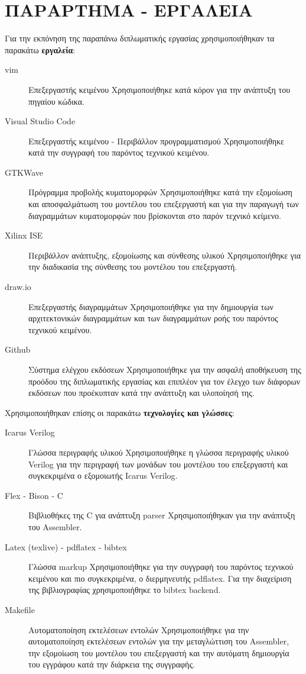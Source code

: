 \documentclass[11pt]{extarticle}
\let\stdsection\section
\renewcommand\section{\newpage\stdsection}
\begin{document}
\section{ΠΑΡΑΡΤΗΜΑ - ΕΡΓΑΛΕΙΑ}
Για την εκπόνηση της παραπάνω διπλωματικής εργασίας χρησιμοποιήθηκαν τα παρακάτω \textbf{εργαλεία}:
\begin{description}
    \item [vim] Επεξεργαστής κειμένου \newline
    Χρησιμοποιήθηκε κατά κόρον για την ανάπτυξη του πηγαίου κώδικα.
    \item [Visual Studio Code] Επεξεργαστής κειμένου - Περιβάλλον προγραμματισμού \newline
    Χρησιμοποιήθηκε κατά την συγγραφή του παρόντος τεχνικού κειμένου.
    \item [GTKWave] Πρόγραμμα προβολής κυματομορφών \newline
    Χρησιμοποιήθηκε κατά την εξομοίωση και αποσφαλμάτωση του μοντέλου του επεξεργαστή και για την παραγωγή των διαγραμμάτων κυματομορφών που βρίσκονται στο παρόν τεχνικό κείμενο.
    \item [Xilinx ISE] Περιβάλλον ανάπτυξης, εξομοίωσης και σύνθεσης υλικού \newline
    Χρησιμοποιήθηκε για την διαδικασία της σύνθεσης του μοντέλου του επεξεργαστή.
    \item [draw.io] Επεξεργαστής διαγραμμάτων \newline
    Χρησιμοποιήθηκε για την δημιουργία των αρχιτεκτονικών διαγραμμάτων και των διαγραμμάτων ροής του παρόντος τεχνικού κειμένου.
    \item [Github] Σύστημα ελέγχου εκδόσεων \newline
    Χρησιμοποιήθηκε για την ασφαλή αποθήκευση της προόδου της διπλωματικής εργασίας και επιπλέον για τον έλεγχο των διάφορων εκδόσεων που προέκυπταν κατά την ανάπτυξη και υλοποίησή της.
\end{description}
Χρησιμοποιήθηκαν επίσης οι παρακάτω \textbf{τεχνολογίες και γλώσσες}:
\begin{description}
    \item [Icarus Verilog] Γλώσσα περιγραφής υλικού \newline
    Χρησιμοποιήθηκε η γλώσσα περιγραφής υλικού Verilog για την περιγραφή των μονάδων του μοντέλου του επεξεργαστή και συγκεκριμένα ο εξομοιωτής Icarus Verilog.
    \item [Flex - Bison - C] Βιβλιοθήκες της C για ανάπτυξη parser \newline
    Χρησιμοποιήθηκαν για την ανάπτυξη του Assembler.
    \item [Latex (texlive) - pdflatex - bibtex] Γλώσσα markup  \newline
    Χρησιμοποιήθηκε για την συγγραφή του παρόντος τεχνικού κειμένου και πιο συγκεκριμένα, ο διερμηνευτής pdflatex.
    Για την διαχείριση της βιβλιογραφίας χρησιμοποιήθηκε το bibtex backend.
    \item [Makefile] Αυτοματοποίηση εκτελέσεων εντολών \newline
    Χρησιμοποιήθηκε για την αυτοματοποίηση εκτελέσεων εντολών για την μεταγλώττιση του Assembler, την εξομοίωση του μοντέλου του επεξεργαστή και την αυτόματη δημιουργία του εγγράφου κατά την διάρκεια της συγγραφής.
\end{description}
\end{document}
